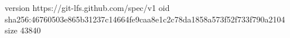 version https://git-lfs.github.com/spec/v1
oid sha256:46760503e865b31237c14664fe9caa8e1c2c78da1858a573f52f733f790a2104
size 43840
